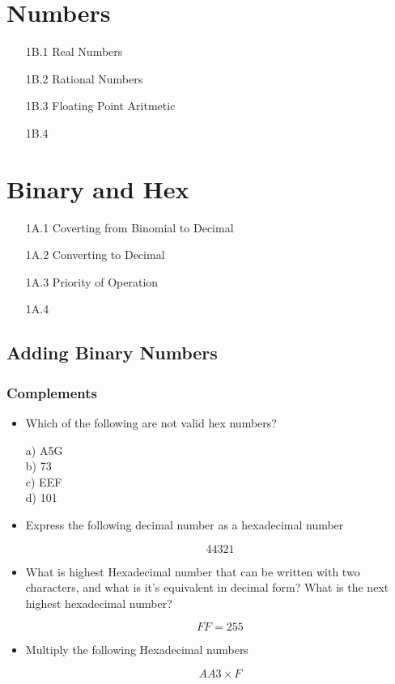 \documentclass{article}
\begin{document}
\section*{Numbers}
\begin{itemize}
\item[1B.1] Real Numbers
\item[1B.2] Rational Numbers
\item[1B.3] Floating Point Aritmetic
\item[1B.4] 
\end{itemize}
\section*{Binary and Hex}
\begin{itemize}
\item[1A.1] Coverting from Binomial to Decimal
\item[1A.2] Converting to Decimal
\item[1A.3] Priority of Operation
\item[1A.4] 
\end{itemize}
\newpage
\subsection*{Adding Binary Numbers}



\subsubsection*{Complements}
\begin{itemize}
\item Which of the following are not valid hex numbers?

a) A5G 	\\
b) 73\\
c) EEF\\	
d) 101\\

\item Express the following decimal number as a hexadecimal number

\[44321\]


\item What is highest Hexadecimal number that can be written with two characters, and what is it's equivalent in decimal form?
What is the next highest hexadecimal number?

\[FF = 255\] %


\item Multiply the following Hexadecimal numbers

\[AA3 \times F\]

\end{itemize}
\end{document}
